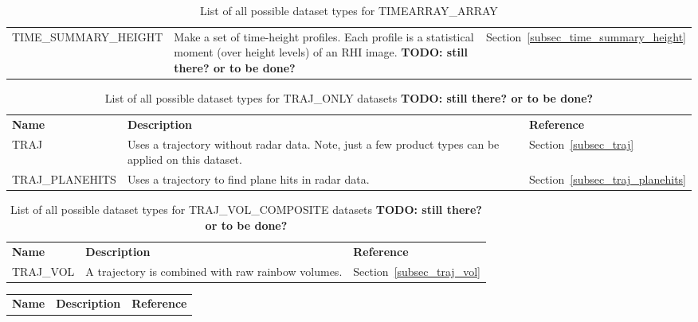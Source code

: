 \documentclass[a4paper,11pt,pdftex,twoside]{scrartcl}
\renewcommand{\bf}{\normalfont \bfseries}
\begin{document}
{{{\begin{table}[H]
\begin{tabularx}{\textwidth}{lXl}
TIME\_SUMMARY\_HEIGHT  & Make a set of time-height profiles. Each profile is a statistical moment (over height levels) of an RHI image. {\bf TODO: still there? or to be done? }                                          & Section~\ref{subsec_time_summary_height}\\
\end{tabularx}
\caption{List of all possible dataset types for TIMEARRAY\_ARRAY}
\label{tab_datasets_TIMEARRAY_ARRAY}
\end{table}

\begin{table}[H]
\begin{tabularx}{\textwidth}{lXl}
\bf{Name}     & \bf{Description}                                & \bf{Reference}\\

TRAJ          & Uses a trajectory without radar data. Note,
                just a few product types can be applied on this
                dataset.                                        & Section~\ref{subsec_traj}\\
TRAJ\_PLANEHITS & Uses a trajectory to find plane hits in
                  radar data.                                   & Section~\ref{subsec_traj_planehits}\\
\end{tabularx}
\caption{List of all possible dataset types for TRAJ\_ONLY datasets {\bf TODO: still there? or to be done? }                                     }
\label{tab_datasets_TRAJ_ONLY}
\end{table}

\begin{table}[H]
\begin{tabularx}{\textwidth}{lXl}
\bf{Name}     & \bf{Description}                                & \bf{Reference}\\

TRAJ\_VOL     & A trajectory is combined with raw rainbow
                volumes.                                        & Section~\ref{subsec_traj_vol}\\
\end{tabularx}
\caption{List of all possible dataset types for TRAJ\_VOL\_COMPOSITE datasets {\bf TODO: still there? or to be done? }                                     }
\label{tab_datasets_TRAJ_VOL_COMPOSITE}
\end{table}

\begin{table}[H]
\begin{tabularx}{\textwidth}{lXl}
\bf{Name}     & \bf{Description}                                & \bf{Reference}\\


\end{tabularx}
\end{table}}}}
\end{document}
